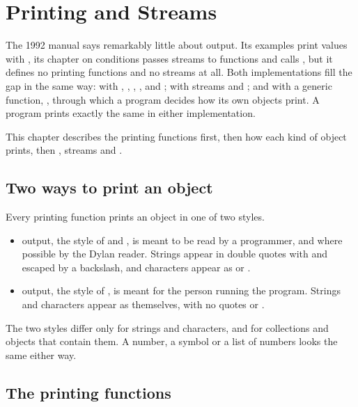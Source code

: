 \chapter{Printing and Streams}\label{ch:printing}

The 1992 manual says remarkably little about output. Its examples print
values with , its chapter on conditions passes streams to
functions and calls , but it defines no printing functions
and no streams at all. Both implementations fill the gap in the same
way: with , , , ,
 and ; with streams and ; and with a
generic function, , through which a program decides
how its own objects print. A program prints exactly the same in either
implementation.

This chapter describes the printing functions first, then how each kind
of object prints, then , streams and .

\section{Two ways to print an object}\label{sec:printing-escape}

Every printing function prints an object in one of two styles.

\begin{itemize}
\item {} output, the style of  and ,
  is meant to be read by a programmer, and where possible by the Dylan
  reader. Strings appear in double quotes with  and \code{\textbackslash}
  escaped by a backslash, and characters appear as 
  or .
\item {} output, the style of , is meant for the
  person running the program. Strings and characters appear as
  themselves, with no quotes or \code{\#\textbackslash}.
\end{itemize}

\noindent
The two styles differ only for strings and characters, and for
collections and objects that contain them. A number, a symbol or a list
of numbers looks the same either way.

\section{The printing functions}\label{sec:printing-functions}

